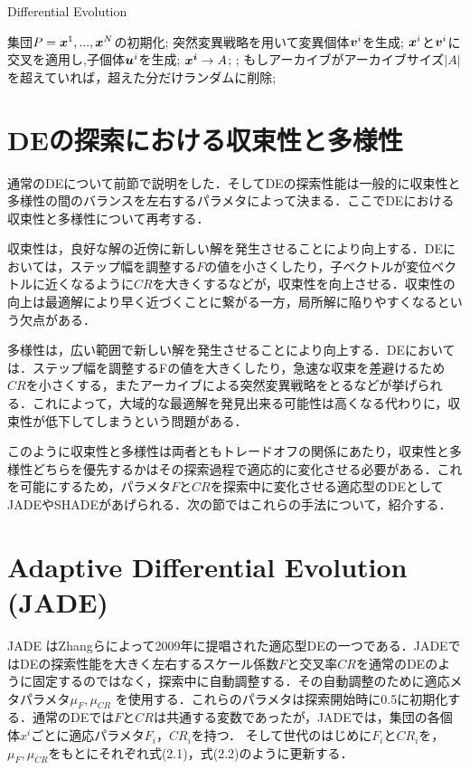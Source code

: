 \documentclass[a4paper,11pt,oneside,openany]{jsbook}
\def\vector#1{\mbox{\boldmath $#1$}}
\begin{document}
\newpage
\begin{algorithm}
\caption{Differential Evolution}
\label{alg:pbnf}
\begin{algorithmic}
\STATE 集団$P={\vector{x}^1,...,\vector{x}^N}$の初期化;
        \STATE 突然変異戦略を用いて変異個体{$\vector{v}^i$}を生成;
        \STATE $\vector{x}^i$と$\vector{v}^i$に交叉を適用し,子個体$\vector{u}^i$を生成;
    \ENDFOR
        \IF {$f(\vector{u}^i) \leqq f(\vector{x}^i)$}
            \STATE $\vector{x^i} \rightarrow {A}$;
            \STATE {$\vector{x}^i :=\vector{u}^i$};
        \ENDIF
    \ENDFOR
    \STATE もしアーカイブがアーカイブサイズ$|A|$を超えていれば，超えた分だけランダムに削除;
\ENDWHILE
\end{algorithmic}
\end{algorithm}
\newpage

\section{DEの探索における収束性と多様性}
通常のDEについて前節で説明をした．そしてDEの探索性能は一般的に収束性と多様性の間のバランスを左右するパラメタによって決まる．ここでDEにおける収束性と多様性について再考する．

収束性は，良好な解の近傍に新しい解を発生させることにより向上する．DEにおいては，ステップ幅を調整する$F$の値を小さくしたり，子ベクトルが変位ベクトルに近くなるように$CR$を大きくするなどが，収束性を向上させる．収束性の向上は最適解により早く近づくことに繋がる一方，局所解に陥りやすくなるという欠点がある．

多様性は，広い範囲で新しい解を発生させることにより向上する．DEにおいては．ステップ幅を調整するFの値を大きくしたり，急速な収束を差避けるため$CR$を小さくする，またアーカイブによる突然変異戦略をとるなどが挙げられる．これによって，大域的な最適解を発見出来る可能性は高くなる代わりに，収束性が低下してしまうという問題がある．

このように収束性と多様性は両者ともトレードオフの関係にあたり，収束性と多様性どちらを優先するかはその探索過程で適応的に変化させる必要がある．これを可能にするため，パラメタ$F$と$CR$を探索中に変化させる適応型のDEとしてJADE\cite{JADE}やSHADE\cite{SHADE}があげられる．次の節ではこれらの手法について，紹介する．

\section{Adaptive Differential Evolution (JADE)}
JADE \cite{JADE} はZhangらによって2009年に提唱された適応型DEの一つである．JADEではDEの探索性能を大きく左右するスケール係数$F$と交叉率$CR$を通常のDEのように固定するのではなく，探索中に自動調整する．その自動調整のために適応メタパラメタ$\mu _F,\mu _{CR}$ を使用する．これらのパラメタは探索開始時に0.5に初期化する．通常のDEでは$F$と$CR$は共通する変数であったが，JADEでは，集団の各個体\vector{x^i}ごとに適応パラメタ$F_i$，$CR_i$を持つ．
そして世代のはじめに$F_i$と$CR_i$を，$\mu _F,\mu _{CR}$をもとにそれぞれ式(2.1)，式(2.2)のように更新する．
\end{document}
